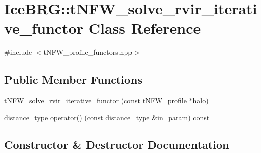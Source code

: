 \hypertarget{classIceBRG_1_1tNFW__solve__rvir__iterative__functor}{}\section{Ice\+B\+R\+G\+:\+:t\+N\+F\+W\+\_\+solve\+\_\+rvir\+\_\+iterative\+\_\+functor Class Reference}
\label{classIceBRG_1_1tNFW__solve__rvir__iterative__functor}


{\ttfamily \#include $<$t\+N\+F\+W\+\_\+profile\+\_\+functors.\+hpp$>$}

\subsection*{Public Member Functions}
\begin{DoxyCompactItemize}
\item 
\hyperlink{classIceBRG_1_1tNFW__solve__rvir__iterative__functor_aef6ac77eb153fd78fb13571446976478}{t\+N\+F\+W\+\_\+solve\+\_\+rvir\+\_\+iterative\+\_\+functor} (const \hyperlink{classIceBRG_1_1tNFW__profile}{t\+N\+F\+W\+\_\+profile} $\ast$halo)
\item 
\hyperlink{namespaceIceBRG_a45499647eb87e24c10ab32c628711cec}{distance\+\_\+type} \hyperlink{classIceBRG_1_1tNFW__solve__rvir__iterative__functor_ab5665bd4c378a6329b1dcbb591596489}{operator()} (const \hyperlink{namespaceIceBRG_a45499647eb87e24c10ab32c628711cec}{distance\+\_\+type} \&in\+\_\+param) const 
\end{DoxyCompactItemize}


\subsection{Constructor \& Destructor Documentation}
\hypertarget{classIceBRG_1_1tNFW__solve__rvir__iterative__functor_aef6ac77eb153fd78fb13571446976478}{}
